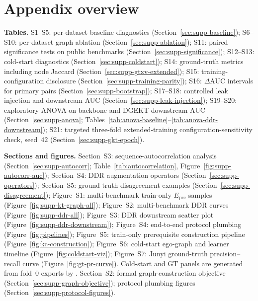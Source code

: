 \documentclass[pdflatex,sn-mathphys-num]{sn-jnl}
\newcommand{\Epre}{\ensuremath{E_{\text{pre}}}}
\newcommand{\DDR}{\textsc{DDR}}
\begin{document}
\section*{Appendix overview}
\label{sec:appendix-index}
\noindent\textbf{Tables.}
S1--S5: per-dataset baseline diagnostics (Section~\ref{sec:supp-baseline});
S6--S10: per-dataset graph ablation (Section~\ref{sec:supp-ablation});
S11: paired significance tests on public benchmarks
(Section~\ref{sec:supp-significance});
S12--S13: cold-start diagnostics (Section~\ref{sec:supp-coldstart});
S14: ground-truth metrics including node Jaccard
(Section~\ref{sec:supp-gtxv-extended});
S15: training-configuration disclosure (Section~\ref{sec:supp-training-parity});
S16: $\Delta$AUC intervals for primary pairs (Section~\ref{sec:supp-bootstrap});
S17--S18: controlled leak injection and downstream AUC
(Section~\ref{sec:supp-leak-injection});
S19--S20: exploratory ANOVA on backbone and DGEKT downstream AUC
(Section~\ref{sec:supp-anova}; Tables~\ref{tab:anova-baseline}--\ref{tab:anova-ddr-downstream});
S21: targeted three-fold extended-training configuration-sensitivity check,
seed~$42$ (Section~\ref{sec:supp-gkt-epoch}).

\medskip\noindent\textbf{Sections and figures.}
Section~S3: sequence-autocorrelation analysis
(Section~\ref{sec:supp-autocorr}; Table~\ref{tab:autocorrelation},
Figure~\ref{fig:supp-autocorr-auc});
Section~S4: \DDR{} augmentation operators (Section~\ref{sec:supp-operators});
Section~S5: ground-truth disagreement examples
(Section~\ref{sec:supp-disagreement});
Figure~S1: multi-benchmark train-only $\Epre$ samples
(Figure~\ref{fig:supp-kt-graph-all});
Figure~S2: multi-benchmark \DDR{} curves (Figure~\ref{fig:supp-ddr-all});
Figure~S3: \DDR{} downstream scatter plot
(Figure~\ref{fig:supp-ddr-downstream});
Figure~S4: end-to-end protocol plumbing (Figure~\ref{fig:pipelines});
Figure~S5: train-only prerequisite construction pipeline
(Figure~\ref{fig:kc-construction});
Figure~S6: cold-start ego-graph and learner timeline
(Figure~\ref{fig:coldstart-viz});
Figure~S7: Junyi ground-truth precision--recall curve
(Figure~\ref{fig:gt-pr-curve}).
Cold-start and GT panels are generated from fold~0 exports by
.
Section~S2: formal graph-construction objective (Section~\ref{sec:supp-graph-objective});
protocol plumbing figures (Section~\ref{sec:supp-protocol-figures}).
\end{document}
